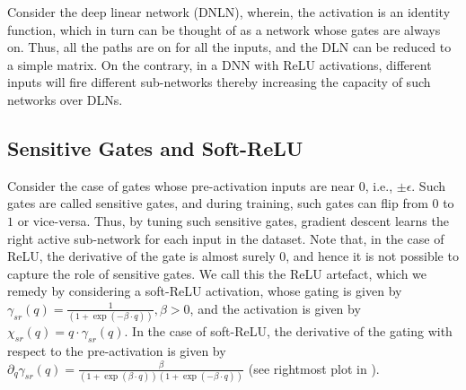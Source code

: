 Consider the deep linear network (DNLN), wherein, the activation is an identity function, which in turn can be thought of as a network whose gates are always on. Thus, all the paths are on for all the inputs, and the DLN can be reduced to a simple matrix. On the contrary, in a DNN with ReLU activations, different inputs will fire different sub-networks thereby increasing the capacity of such networks over DLNs.

\subsection{Sensitive Gates and Soft-ReLU} 
Consider the case of gates whose pre-activation inputs are near $0$, i.e., $\pm\epsilon$. Such gates are called sensitive gates, and during training, such gates can flip from $0$ to $1$ or vice-versa. Thus, by tuning such sensitive gates, gradient descent learns the right active sub-network for each input in the dataset. Note that, in the case of ReLU, the derivative of the gate is almost surely $0$, and hence it is not possible to capture the role of sensitive gates. We call this the ReLU artefact, which we remedy by considering a soft-ReLU activation, whose gating is given by $\gamma_{sr}(q)=\frac{1}{\left(1+\exp(-\beta \cdot q)\right)}, \beta>0$, and the activation is given by $\chi_{sr}(q)=q\cdot \gamma_{sr}(q)$. In the case of soft-ReLU, the derivative of the gating with respect to the pre-activation is given by $\partial_{q}\gamma_{sr}(q)=\frac{\beta}{\left(1+\exp(\beta\cdot q)\right)\left(1+\exp(-\beta\cdot q)\right)}$ (see rightmost plot in ).
